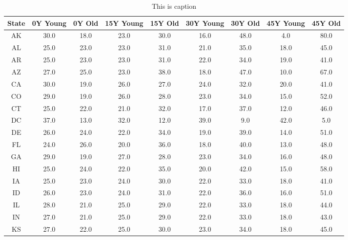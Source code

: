 \begin{table}
\centering
\caption{This is caption}
\label{tab:forecast_table}
\begin{tabular}{ccccccccc}
\toprule
State & 0Y Young & 0Y Old & 15Y Young & 15Y Old & 30Y Young & 30Y Old & 45Y Young & 45Y Old \\
\midrule
   AK &     30.0 &   18.0 &      23.0 &    30.0 &      16.0 &    48.0 &       4.0 &    80.0 \\
   AL &     25.0 &   23.0 &      23.0 &    31.0 &      21.0 &    35.0 &      18.0 &    45.0 \\
   AR &     25.0 &   23.0 &      23.0 &    31.0 &      22.0 &    34.0 &      19.0 &    41.0 \\
   AZ &     27.0 &   25.0 &      23.0 &    38.0 &      18.0 &    47.0 &      10.0 &    67.0 \\
   CA &     30.0 &   19.0 &      26.0 &    27.0 &      24.0 &    32.0 &      20.0 &    41.0 \\
   CO &     29.0 &   19.0 &      26.0 &    28.0 &      23.0 &    34.0 &      15.0 &    52.0 \\
   CT &     25.0 &   22.0 &      21.0 &    32.0 &      17.0 &    37.0 &      12.0 &    46.0 \\
   DC &     37.0 &   13.0 &      32.0 &    12.0 &      39.0 &     9.0 &      42.0 &     5.0 \\
   DE &     26.0 &   24.0 &      22.0 &    34.0 &      19.0 &    39.0 &      14.0 &    51.0 \\
   FL &     24.0 &   26.0 &      20.0 &    36.0 &      18.0 &    40.0 &      13.0 &    48.0 \\
   GA &     29.0 &   19.0 &      27.0 &    28.0 &      23.0 &    34.0 &      16.0 &    48.0 \\
   HI &     25.0 &   24.0 &      22.0 &    35.0 &      20.0 &    42.0 &      15.0 &    58.0 \\
   IA &     25.0 &   23.0 &      24.0 &    30.0 &      22.0 &    33.0 &      18.0 &    41.0 \\
   ID &     26.0 &   23.0 &      24.0 &    31.0 &      22.0 &    36.0 &      16.0 &    51.0 \\
   IL &     28.0 &   21.0 &      25.0 &    29.0 &      22.0 &    33.0 &      18.0 &    44.0 \\
   IN &     27.0 &   21.0 &      25.0 &    29.0 &      22.0 &    33.0 &      18.0 &    43.0 \\
   KS &     27.0 &   22.0 &      25.0 &    30.0 &      23.0 &    34.0 &      18.0 &    45.0 \\

\end{tabular}
\end{table}
